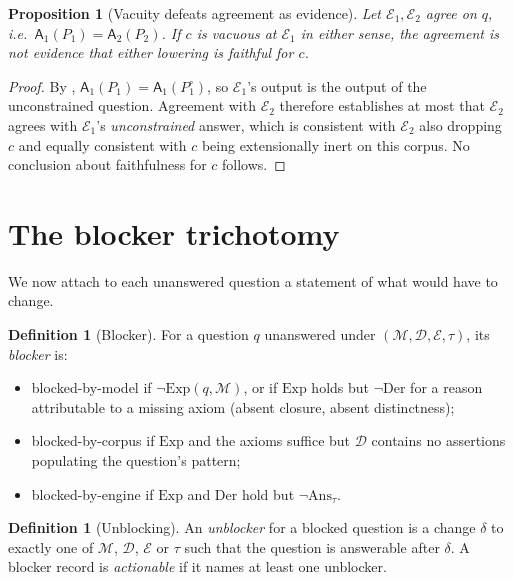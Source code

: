 \documentclass[11pt,a4paper]{article}
\theoremstyle{plain}
\newtheorem{proposition}[theorem]{Proposition}
\theoremstyle{definition}
\newtheorem{definition}[theorem]{Definition}
\theoremstyle{remark}
\newcommand{\Model}{\mathcal{M}}          %
\newcommand{\Corpus}{\mathcal{D}}         %
\newcommand{\Engine}{\mathcal{E}}         %
\newcommand{\Ans}{\mathsf{A}}             %
\newcommand{\qq}{q}
\begin{document}
\begin{proposition}[Vacuity defeats agreement as evidence]
\label{prop:agreement}
Let $\Engine_1, \Engine_2$ agree on $\qq$, i.e.\
$\Ans_1(P_1) = \Ans_2(P_2)$. If $c$ is vacuous at $\Engine_1$ in either sense,
the agreement is not evidence that either lowering is faithful for $c$.
\end{proposition}

\begin{proof}
By , $\Ans_1(P_1) = \Ans_1(P_1^\circ)$, so
$\Engine_1$'s output is the output of the unconstrained question. Agreement
with $\Engine_2$ therefore establishes at most that $\Engine_2$ agrees with
$\Engine_1$'s \emph{unconstrained} answer, which is consistent with
$\Engine_2$ also dropping $c$ and equally consistent with $c$ being
extensionally inert on this corpus. No conclusion about faithfulness for $c$
follows.
\end{proof}

\section{The blocker trichotomy}
\label{sec:blockers}

We now attach to each unanswered question a statement of what would have to
change.

\begin{definition}[Blocker]
\label{def:blocker}
For a question $\qq$ unanswered under $(\Model,\Corpus,\Engine,\tau)$, its
\emph{blocker} is:
\begin{itemize}[leftmargin=*]
\item \textsf{blocked-by-model} if $\neg\mathrm{Exp}(\qq,\Model)$, or if
      $\mathrm{Exp}$ holds but $\neg\mathrm{Der}$ for a reason attributable to
      a missing axiom (absent closure, absent distinctness);
\item \textsf{blocked-by-corpus} if $\mathrm{Exp}$ and the axioms suffice but
      $\Corpus$ contains no assertions populating the question's pattern;
\item \textsf{blocked-by-engine} if $\mathrm{Exp}$ and $\mathrm{Der}$ hold but
      $\neg\mathrm{Ans}_\tau$.
\end{itemize}
\end{definition}

\begin{definition}[Unblocking]
\label{def:unblocking}
An \emph{unblocker} for a blocked question is a change $\delta$ to exactly one
of $\Model$, $\Corpus$, $\Engine$ or $\tau$ such that the question is
answerable after $\delta$. A blocker record is \emph{actionable} if it names
at least one unblocker.
\end{definition}
\end{document}
